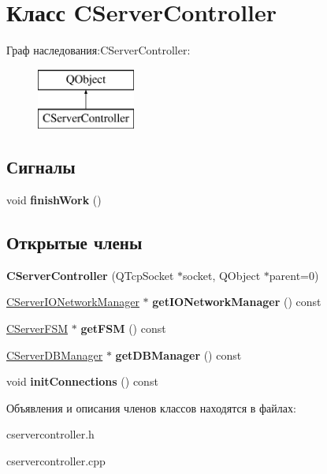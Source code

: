 \hypertarget{class_c_server_controller}{}\section{Класс C\+Server\+Controller}
\label{class_c_server_controller}
Граф наследования\+:C\+Server\+Controller\+:\begin{figure}[H]
\begin{center}
\leavevmode
\includegraphics[height=2.000000cm]{class_c_server_controller}
\end{center}
\end{figure}
\subsection*{Сигналы}
\begin{DoxyCompactItemize}
\item 
\hypertarget{class_c_server_controller_a49ac8bb325430fc9112056d862c5c117}{}\label{class_c_server_controller_a49ac8bb325430fc9112056d862c5c117} 
void {\bfseries finish\+Work} ()
\end{DoxyCompactItemize}
\subsection*{Открытые члены}
\begin{DoxyCompactItemize}
\item 
\hypertarget{class_c_server_controller_ac7fa78891be114aa9ae1985541d5a766}{}\label{class_c_server_controller_ac7fa78891be114aa9ae1985541d5a766} 
{\bfseries C\+Server\+Controller} (Q\+Tcp\+Socket $\ast$socket, Q\+Object $\ast$parent=0)
\item 
\hypertarget{class_c_server_controller_a9934f4eb54e1e1debd1aa6fd5e036012}{}\label{class_c_server_controller_a9934f4eb54e1e1debd1aa6fd5e036012} 
\hyperlink{class_c_server_i_o_network_manager}{C\+Server\+I\+O\+Network\+Manager} $\ast$ {\bfseries get\+I\+O\+Network\+Manager} () const
\item 
\hypertarget{class_c_server_controller_ade77d98a3358e5b1914ebbffa7d810ce}{}\label{class_c_server_controller_ade77d98a3358e5b1914ebbffa7d810ce} 
\hyperlink{class_c_server_f_s_m}{C\+Server\+F\+SM} $\ast$ {\bfseries get\+F\+SM} () const
\item 
\hypertarget{class_c_server_controller_a2dc0dbf4a5ee9356f10b2156ad2ce712}{}\label{class_c_server_controller_a2dc0dbf4a5ee9356f10b2156ad2ce712} 
\hyperlink{class_c_server_d_b_manager}{C\+Server\+D\+B\+Manager} $\ast$ {\bfseries get\+D\+B\+Manager} () const
\item 
\hypertarget{class_c_server_controller_aeccfde1d541a9f57f8276cc6a24aea12}{}\label{class_c_server_controller_aeccfde1d541a9f57f8276cc6a24aea12} 
void {\bfseries init\+Connections} () const
\end{DoxyCompactItemize}


Объявления и описания членов классов находятся в файлах\+:\begin{DoxyCompactItemize}
\item 
cservercontroller.\+h\item 
cservercontroller.\+cpp\end{DoxyCompactItemize}
